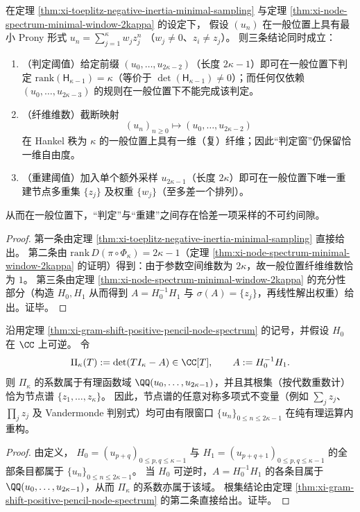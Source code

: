 \begin{corollary}\label{cor:xi-prony-decision-reconstruction-one-sample-gap}
在定理 \ref{thm:xi-toeplitz-negative-inertia-minimal-sampling} 与定理 \ref{thm:xi-node-spectrum-minimal-window-2kappa} 的设定下，
假设 \((u_n)\) 在一般位置上具有最小 Prony 形式
\(
u_n=\sum_{j=1}^{\kappa}w_j z_j^{n}
\)
（\(w_j\neq 0\)、\(z_i\neq z_j\)）。
则三条结论同时成立：
\begin{enumerate}
  \item \textnormal{（判定阈值）}给定前缀 \((u_0,\dots,u_{2\kappa-2})\)（长度 \(2\kappa-1\)）即可在一般位置下判定 \(\mathrm{rank}(\mathsf H_{\kappa-1})=\kappa\)（等价于 \(\det(\mathsf H_{\kappa-1})\neq 0\)）；而任何仅依赖 \((u_0,\dots,u_{2\kappa-3})\) 的规则在一般位置下不能完成该判定。
  \item \textnormal{（纤维维数）}截断映射
  \[
  (u_n)_{n\ge 0}\longmapsto (u_0,\dots,u_{2\kappa-2})
  \]
  在 Hankel 秩为 \(\kappa\) 的一般位置上具有一维（复）纤维；因此“判定窗”仍保留恰一维自由度。
  \item \textnormal{（重建阈值）}加入单个额外采样 \(u_{2\kappa-1}\)（长度 \(2\kappa\)）即可在一般位置下唯一重建节点多重集 \(\{z_j\}\) 及权重 \(\{w_j\}\)（至多差一个排列）。
\end{enumerate}
从而在一般位置下，“判定”与“重建”之间存在恰差一项采样的不可约间隙。
\end{corollary}

\begin{proof}
第一条由定理 \ref{thm:xi-toeplitz-negative-inertia-minimal-sampling} 直接给出。
第二条由 \(\mathrm{rank}\,D(\pi\circ\Phi_\kappa)=2\kappa-1\)（定理 \ref{thm:xi-node-spectrum-minimal-window-2kappa} 的证明）得到：由于参数空间维数为 \(2\kappa\)，故一般位置纤维维数恰为 \(1\)。
第三条由定理 \ref{thm:xi-node-spectrum-minimal-window-2kappa} 的充分性部分（构造 \(H_0,H_1\) 从而得到 \(A=H_0^{-1}H_1\) 与 \(\sigma(A)=\{z_j\}\)，再线性解出权重）给出。证毕。
\end{proof}

\begin{corollary}\label{cor:xi-node-polynomial-rational-reconstruction}
沿用定理 \ref{thm:xi-gram-shift-positive-pencil-node-spectrum} 的记号，并假设 \(H_0\) 在 \(\CC\) 上可逆。
令
\[
\Pi_\kappa(T):=\det(TI_\kappa-A)\in\CC[T],
\qquad A:=H_0^{-1}H_1.
\]
则 \(\Pi_\kappa\) 的系数属于有理函数域 \(\QQ(u_0,\dots,u_{2\kappa-1})\)，并且其根集（按代数重数计）恰为节点谱 \(\{z_1,\dots,z_\kappa\}\)。
因此，节点谱的任意对称多项式不变量（例如 \(\sum_j z_j\)、\(\prod_j z_j\) 及 Vandermonde 判别式）均可由有限窗口 \(\{u_n\}_{0\le n\le 2\kappa-1}\) 在纯有理运算内重构。
\end{corollary}
\begin{proof}
由定义，
\(
H_0=(u_{p+q})_{0\le p,q\le \kappa-1}
\)
与
\(
H_1=(u_{p+q+1})_{0\le p,q\le \kappa-1}
\)
的全部条目都属于 \(\{u_n\}_{0\le n\le 2\kappa-1}\)。
当 \(H_0\) 可逆时，\(A=H_0^{-1}H_1\) 的各条目属于 \(\QQ(u_0,\dots,u_{2\kappa-1})\)，从而 \(\Pi_\kappa\) 的系数亦属于该域。
根集结论由定理 \ref{thm:xi-gram-shift-positive-pencil-node-spectrum} 的第二条直接给出。证毕。
\end{proof}

